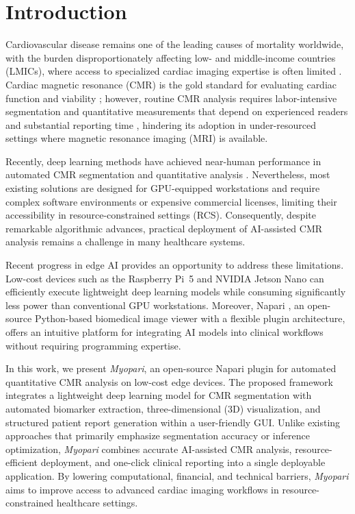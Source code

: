 \documentclass[runningheads]{llncs}
\begin{document}
\section{Introduction}

Cardiovascular disease remains one of the leading causes of mortality worldwide, with the burden disproportionately affecting low- and middle-income countries (LMICs), where access to specialized cardiac imaging expertise is often limited \cite{chong2025global}. Cardiac magnetic resonance (CMR) is the gold standard for evaluating cardiac function and viability \cite{kawel2020reference}; however, routine CMR analysis requires labor-intensive segmentation and quantitative measurements that depend on experienced readers and substantial reporting time \cite{chen2020deep}, hindering its adoption in under-resourced settings where magnetic resonance imaging (MRI) is available.  

Recently, deep learning methods have achieved near-human performance in automated CMR segmentation and quantitative analysis \cite{chen2020deep,bai2018automated,U-Net,fan2023vit}. Nevertheless, most existing solutions are designed for GPU-equipped workstations and require complex software environments or expensive commercial licenses, limiting their accessibility in resource-constrained settings (RCS). Consequently, despite remarkable algorithmic advances, practical deployment of AI-assisted CMR analysis remains a challenge in many healthcare systems.

Recent progress in edge AI provides an opportunity to address these limitations. Low-cost devices such as the Raspberry Pi~5 \cite{raspberry} and NVIDIA Jetson Nano \cite{jetsonnano} can efficiently execute lightweight deep learning models while consuming significantly less power than conventional GPU workstations. Moreover, Napari \cite{napari}, an open-source Python-based biomedical image viewer with a flexible plugin architecture, offers an intuitive platform for integrating AI models into clinical workflows without requiring programming expertise.

In this work, we present \textit{Myopari}, an open-source Napari plugin for automated quantitative CMR analysis on low-cost edge devices. The proposed framework integrates a lightweight deep learning model for CMR segmentation with automated biomarker extraction, three-dimensional (3D) visualization, and structured patient report generation within a user-friendly GUI. Unlike existing approaches that primarily emphasize segmentation accuracy or inference optimization, \textit{Myopari} combines accurate AI-assisted CMR analysis, resource-efficient deployment, and one-click clinical reporting into a single deployable application. By lowering computational, financial, and technical barriers, \textit{Myopari} aims to improve access to advanced cardiac imaging workflows in resource-constrained healthcare settings.
\end{document}
